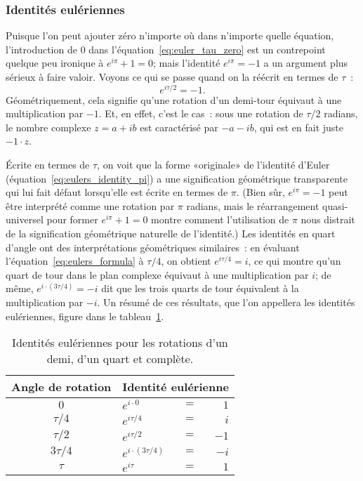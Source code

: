       \subsubsection{Identités eulériennes} %
      \label{sec:eulerian_identities}

Puisque l'on peut ajouter zéro n'importe où dans n'importe quelle équation,
l'introduction de $0$ dans l'équation~\eqref{eq:euler_tau_zero} est un
contrepoint quelque peu ironique à $e^{i\pi} + 1 = 0$\ns; mais l'identité
$e^{i\pi} = -1$ a un argument plus sérieux à faire valoir. Voyons ce qui
se passe quand on la réécrit en termes de $\tau$~:
\[
e^{i\tau /2} = -1.
\]
Géométriquement, cela signifie qu'une rotation d'un demi-tour équivaut à une
multiplication par $-1$. Et, en effet, c'est le cas~: sous une rotation de
$\tau/2$ radians, le nombre complexe $z = a + ib$ est caractérisé par $-a - ib$, qui
est en fait juste $-1\cdot z$.

Écrite en termes de $\tau$, on voit que la forme «\ns originale\ns » de l'identité
d'Euler (équation~\eqref{eq:eulers_identity_pi}) a une signification
géométrique transparente qui lui fait défaut lorsqu'elle est écrite en termes de
$\pi$. (Bien sûr, $e^{i\pi} = -1$ peut être interprété comme une rotation par
$\pi$ radians, mais le réarrangement quasi-universel pour former $e^{i\pi} + 1 =
0$ montre comment l'utilisation de $\pi$ nous distrait de la signification
géométrique naturelle de l'identité.) Les identités en quart d'angle ont des
interprétations géométriques similaires~: en évaluant
l'équation~\eqref{eq:eulers_formula} à $\tau/4$, on obtient $e^{i\tau/4} = i$,
ce qui montre qu'un quart de tour dans le plan complexe équivaut à une multiplication
par $i$\ns; de même, $e^{i\cdot(3\tau/4)} = -i$ dit que les trois quarts de tour
équivalent à la multiplication par $-i$. Un résumé de ces résultats, que l'on
appellera les identités eulériennes, figure dans le
tableau~\ref{table:eulerian_identities}.

\begin{table}
\begin{center}
\begin{tabular}{cllr}
Angle de rotation & \multicolumn{3}{c}{Identité eulérienne} \\ \hline
$0$ & $e^{i\cdot0}$ & $ = $ & $1$ \smallskip \\
$\tau/4$ & $e^{i\tau/4}$ & $ = $ & $i$ \smallskip \\
$\tau/2$ & $e^{i\tau/2}$ & $ = $ & $-1$ \smallskip \\
$3\tau/4$ & $e^{i\cdot(3\tau/4)}$ & $ = $ & $-i$ \smallskip \\
$\tau$ & $e^{i\tau}$ & $ = $ & $1$
\end{tabular}
\end{center}
\caption{Identités eulériennes pour les rotations d'un demi, d'un quart et
complète.\label{table:eulerian_identities}}
\end{table}

